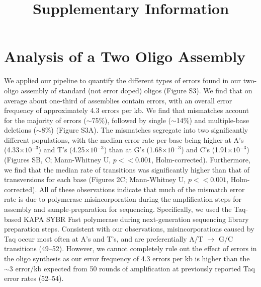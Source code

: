 \documentclass[letterpaper,12pt]{article}
\newcommand{\beginsupplement}{%
        \setcounter{table}{0}
        \renewcommand{\thetable}{S\arabic{table}}%
        \setcounter{figure}{0}
        \renewcommand{\thefigure}{S\arabic{figure}}%
     }
\begin{document}
\beginsupplement

\title{Supplementary Information}
\maketitle

\section*{Analysis of a Two Oligo Assembly}
We applied our pipeline to quantify the different types of errors found in our two-oligo assembly of standard (not error doped) oligos (Figure S3). We find that on average about one-third of assemblies contain errors, with an overall error frequency of approximately 4.3 errors per kb. We find that mismatches account for the majority of errors ($\sim$75\%), followed by single ($\sim$14\%) and multiple-base deletions ($\sim$8\%) (Figure S3A). The mismatches segregate into two significantly different populations, with the median error rate per base being higher at A’s (4.33$\times 10^{-3}$) and T’s (4.25$\times 10^{-3}$) than at G’s (1.68$\times 10^{-3}$) and C’s (1.91$\times 10^{-3}$) (Figures SB, C; Mann-Whitney U, $p<<0.001$, Holm-corrected). Furthermore, we find that the median rate of transitions was significantly higher than that of transversions for each base (Figures 2C; Mann-Whitney U, $p<<0.001$, Holm-corrected). All of these observations indicate that much of the mismatch error rate is due to polymerase misincorporation during the amplification steps for assembly and sample-preparation for sequencing. Specifically, we used the Taq-based KAPA SYBR Fast polymerase during next-generation sequencing library preparation steps. Consistent with our observations, misincorporations caused by Taq occur most often at A’s and T’s, and are preferentially A/T $\to$ G/C transitions (49–52). However, we cannot completely rule out the effect of errors in the oligo synthesis as our error frequency of 4.3 errors per kb is higher than the $\sim$3 error/kb expected from 50 rounds of amplification at previously reported Taq error rates (52–54).
\end{document}
